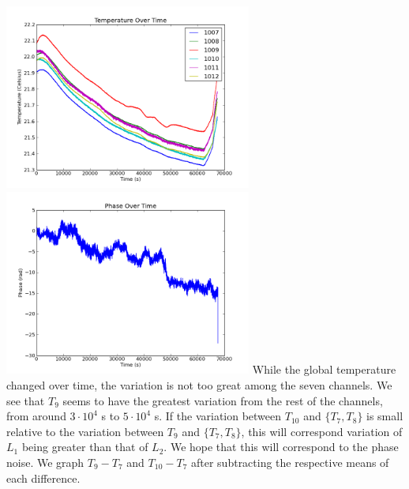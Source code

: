 \documentclass[11 pt]{article}
\begin{document}
\noindent\includegraphics[width=3.2in]{Figure2.png}\includegraphics[width=3.2in]{Figure3.png}\vspace{.7cm}
While the global temperature changed over time, the variation is not too great among the seven channels. We see that $T_9$ seems to have the greatest variation from the rest of the channels, from around $3\cdot 10^4$ s to $5\cdot 10^4$ s. If the variation between $T_{10}$ and $\{T_7,T_8\}$ is small relative to the variation between $T_9$ and $\{T_7,T_8\}$, this will correspond variation of $L_1$ being greater than that of $L_2$. We hope that this will correspond to the phase noise. We graph $T_9-T_7$ and $T_{10}-T_7$ after subtracting the respective means of each difference.
\end{document}
